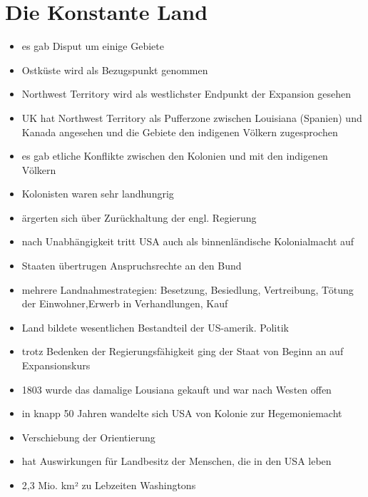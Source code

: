 \documentclass[10pt,a4paper,oneside,ngerman,numbers=noenddot]{scrartcl}
\newenvironment{myitemize}{\begin{itemize}\itemsep -9pt}{\end{itemize}} %
\begin{document}
\section*{Die Konstante Land}
\begin{myitemize}
    \item es gab Disput um einige Gebiete
    \item Ostküste wird als Bezugspunkt genommen
    \item Northwest Territory wird als westlichster Endpunkt der Expansion gesehen
    \item UK hat Northwest Territory als Pufferzone zwischen Louisiana (Spanien) und Kanada
          angesehen und die Gebiete den indigenen Völkern zugesprochen
    \item es gab etliche Konflikte zwischen den Kolonien und mit den indigenen Völkern
    \item Kolonisten waren sehr landhungrig
    \item ärgerten sich über Zurückhaltung der engl. Regierung
    \item nach Unabhängigkeit tritt USA auch als binnenländische Kolonialmacht auf
    \item Staaten übertrugen Anspruchsrechte an den Bund
    \item mehrere Landnahmestrategien: Besetzung, Besiedlung, Vertreibung, Tötung der Einwohner,Erwerb in Verhandlungen, Kauf
    \item Land bildete wesentlichen Bestandteil der US-amerik. Politik
    \item trotz Bedenken der Regierungsfähigkeit ging der Staat von Beginn an auf Expansionskurs
    \item 1803 wurde das damalige Lousiana gekauft und war nach Westen offen
    \item in knapp 50 Jahren wandelte sich USA von Kolonie zur Hegemoniemacht
    \item Verschiebung der Orientierung
    \item hat Auswirkungen für Landbesitz der Menschen, die in den USA leben
    \item 2,3 Mio. km² zu Lebzeiten Washingtons
\end{myitemize}
\end{document}
